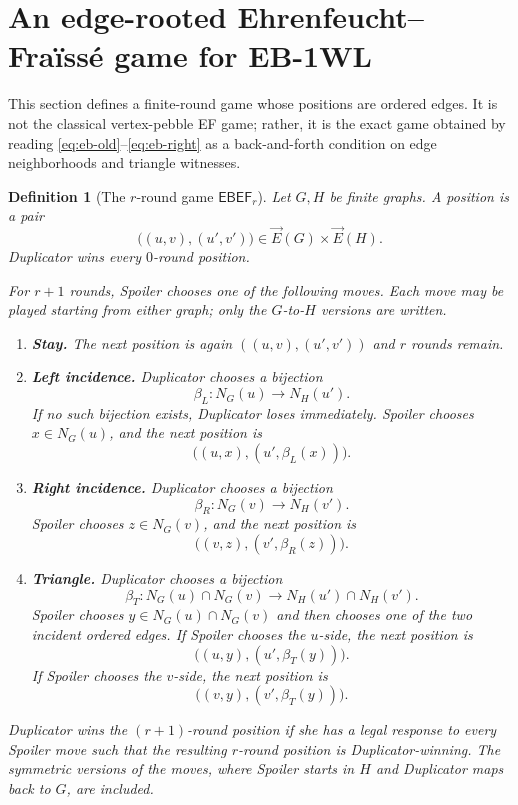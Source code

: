 \documentclass[11pt]{article}
\newtheorem{definition}[theorem]{Definition}
\newcommand{\vecE}{\overrightarrow{E}}
\newcommand{\EBEF}{\mathsf{EBEF}}
\begin{document}
\section{An edge-rooted Ehrenfeucht--Fra\"iss\'e game for EB-1WL}
\label{sec:ef-game}

This section defines a finite-round game whose positions are ordered edges.  It is not the classical vertex-pebble EF game; rather, it is the exact game obtained by reading \eqref{eq:eb-old}--\eqref{eq:eb-right} as a back-and-forth condition on edge neighborhoods and triangle witnesses.

\begin{definition}[The $r$-round game $\EBEF_r$]
Let $G,H$ be finite graphs.  A position is a pair
\[
\bigl((u,v),(u',v')\bigr)\in \vecE(G)\times\vecE(H).
\]
Duplicator wins every $0$-round position.

For $r+1$ rounds, Spoiler chooses one of the following moves.  Each move may be played starting from either graph; only the $G$-to-$H$ versions are written.
\begin{enumerate}[label=\textup{(\roman*)},leftmargin=2.4em]
\item \textbf{Stay.}  The next position is again $((u,v),(u',v'))$ and $r$ rounds remain.

\item \textbf{Left incidence.}  Duplicator chooses a bijection
\[
\beta_L:N_G(u)\to N_H(u').
\]
If no such bijection exists, Duplicator loses immediately.  Spoiler chooses $x\in N_G(u)$, and the next position is
\[
\bigl((u,x),(u',\beta_L(x))\bigr).
\]

\item \textbf{Right incidence.}  Duplicator chooses a bijection
\[
\beta_R:N_G(v)\to N_H(v').
\]
Spoiler chooses $z\in N_G(v)$, and the next position is
\[
\bigl((v,z),(v',\beta_R(z))\bigr).
\]

\item \textbf{Triangle.}  Duplicator chooses a bijection
\[
\beta_T:N_G(u)\cap N_G(v)\to N_H(u')\cap N_H(v').
\]
Spoiler chooses $y\in N_G(u)\cap N_G(v)$ and then chooses one of the two incident ordered edges.  If Spoiler chooses the $u$-side, the next position is
\[
\bigl((u,y),(u',\beta_T(y))\bigr).
\]
If Spoiler chooses the $v$-side, the next position is
\[
\bigl((v,y),(v',\beta_T(y))\bigr).
\]
\end{enumerate}
Duplicator wins the $(r+1)$-round position if she has a legal response to every Spoiler move such that the resulting $r$-round position is Duplicator-winning.  The symmetric versions of the moves, where Spoiler starts in $H$ and Duplicator maps back to $G$, are included.
\end{definition}
\end{document}
